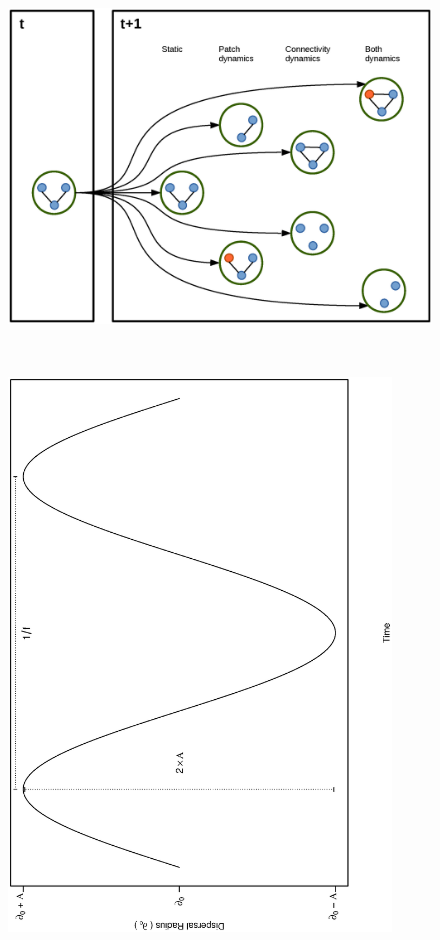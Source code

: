 \documentclass[12pt]{article}
\begin{document}
\begin{figure}
\hspace{0.75 in}\includegraphics[height=4in,width=5in]{./figures/Figure2.eps}
\caption{}
\label{fig:Figure2}
\end{figure}

\begin{figure}[hb!]
\includegraphics[width=4in, angle=-90]{./figures/BasisForEquation.eps}
\caption{}
\label{fig:Figure3}
\end{figure}
\end{document}
